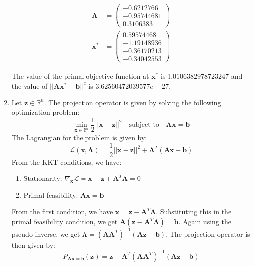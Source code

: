 \documentclass[12pt,a4paper]{article}
\newcommand{\R}{\mathbb{R}}
\theoremstyle{remark}
\begin{document}
\begin{enumerate}
    \begin{align*}
        \mathbf{\Lambda} &= \begin{pmatrix}
            -0.6212766\\
            -0.95744681\\
            0.3106383
        \end{pmatrix}\\
        \mathbf{x}^* &= \begin{pmatrix}
            0.59574468\\
            - 1.19148936\\
            - 0.36170213\\
            - 0.34042553
        \end{pmatrix}
    \end{align*}

    The value of the primal objective function at $\mathbf{x}^*$ is $1.0106382978723247$ and the value of $||\mathbf{Ax^* - b}||^2$ is $3.62560472039577e-27$.

    \item Let $\mathbf{z} \in \R^n$. The projection operator is given by solving the following optimization problem:
    \[
        \min_{\mathbf{x} \in \R^n} \frac{1}{2} ||\mathbf{x} - \mathbf{z}||^2 \quad \text{subject to} \quad \mathbf{Ax = \mathbf{b}}
    \]
    The Lagrangian for the problem is given by:
    \[
        \mathcal{L}(\mathbf{x}, \mathbf{\Lambda}) = \frac{1}{2} ||\mathbf{x} - \mathbf{z}||^2 + \mathbf{\Lambda}^T (\mathbf{Ax - b})
    \]
    From the KKT conditions, we have:
    \begin{enumerate}
        \item Stationarity: \(\nabla_{\mathbf{x}} \mathcal{L} = \mathbf{x} - \mathbf{z} + \mathbf{A}^T \mathbf{\Lambda} = 0\)
        \item Primal feasibility: \(\mathbf{Ax} = \mathbf{b}\)
    \end{enumerate}

    From the first condition, we have \(\mathbf{x} = \mathbf{z} - \mathbf{A}^T \mathbf{\Lambda}\). Substituting this in the primal feasibility condition, we get \(\mathbf{A} (\mathbf{z} - \mathbf{A}^T \mathbf{\Lambda}) = \mathbf{b}\). Again using the pseudo-inverse, we get \(\mathbf{\Lambda} = (\mathbf{AA}^T)^{-1} (\mathbf{Az - \mathbf{b}})\). The projection operator is then given by:
    \[P_{\mathbf{Ax = b}}(\mathbf{z}) = \mathbf{z} - \mathbf{A}^T (\mathbf{AA}^T)^{-1} (\mathbf{Az - \mathbf{b}})\]


\end{enumerate}
\end{document}
